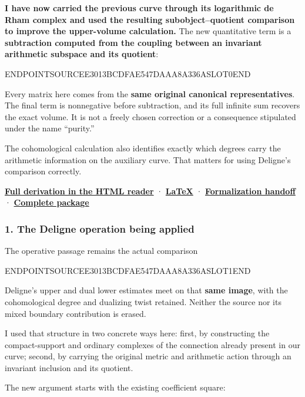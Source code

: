 \textbf{I have now carried the previous curve through its logarithmic de Rham complex and used the resulting subobject--quotient comparison to improve the upper-volume calculation.} The new quantitative term is a \textbf{subtraction computed from the coupling between an invariant arithmetic subspace and its quotient}:

ENDPOINTSOURCEE3013BCDFAE547DAAA8A336ASLOT0END

Every matrix here comes from the \textbf{same original canonical representatives}. The final term is nonnegative before subtraction, and its full infinite sum recovers the exact volume. It is not a freely chosen correction or a consequence stipulated under the name ``purity.''

The cohomological calculation also identifies exactly which degrees carry the arithmetic information on the auxiliary curve. That matters for using Deligne's comparison correctly.

\href{sources/endpoint_user_sources/HISTORICAL_DOWNLOAD_LINKS.md}{\textbf{Full derivation in the HTML reader}} · \href{sources/endpoint_user_sources/HISTORICAL_DOWNLOAD_LINKS.md}{\textbf{LaTeX}} · \href{sources/endpoint_user_sources/HISTORICAL_DOWNLOAD_LINKS.md}{\textbf{Formalization handoff}} · \href{sources/endpoint_user_sources/HISTORICAL_DOWNLOAD_LINKS.md}{\textbf{Complete package}}

\subsubsection{1. The Deligne operation being applied}\label{endpoint-exponential_constituent_original--the-deligne-operation-being-applied}

The operative passage remains the actual comparison

ENDPOINTSOURCEE3013BCDFAE547DAAA8A336ASLOT1END

Deligne's upper and dual lower estimates meet on that \textbf{same image}, with the cohomological degree and dualizing twist retained. Neither the source nor its mixed boundary contribution is erased.

I used that structure in two concrete ways here: first, by constructing the compact-support and ordinary complexes of the connection already present in our curve; second, by carrying the original metric and arithmetic action through an invariant inclusion and its quotient.

The new argument starts with the existing coefficient square:

